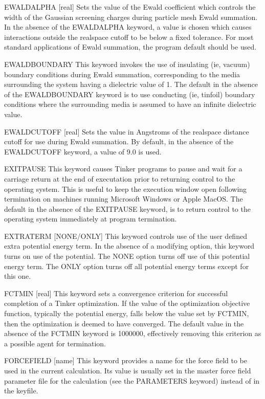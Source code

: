 \documentclass[letterpaper,11pt,english]{sphinxmanual}
\begin{document}
EWALD\sphinxhyphen{}ALPHA {[}real{]}     Sets the value of the Ewald coefficient which controls the width of the Gaussian screening charges during particle mesh Ewald summation. In the absence of the EWALD\sphinxhyphen{}ALPHA keyword, a value is chosen which causes interactions outside the real\sphinxhyphen{}space cutoff to be below a fixed tolerance. For most standard applications of Ewald summation, the program default should be used.

EWALD\sphinxhyphen{}BOUNDARY     This keyword invokes the use of insulating (ie, vacuum) boundary conditions during Ewald summation, corresponding to the media surrounding the system having a dielectric value of 1. The default in the absence of the EWALD\sphinxhyphen{}BOUNDARY keyword is to use conducting (ie, tinfoil) boundary conditions where the surrounding media is assumed to have an infinite dielectric value.

EWALD\sphinxhyphen{}CUTOFF {[}real{]}     Sets the value in Angstroms of the real\sphinxhyphen{}space distance cutoff for use during Ewald summation. By default, in the absence of the EWALD\sphinxhyphen{}CUTOFF keyword, a value of 9.0 is used.

EXIT\sphinxhyphen{}PAUSE     This keyword causes Tinker programs to pause and wait for a carriage return at the end of executation prior to returning control to the operating system. This is useful to keep the execution window open following termination on machines running Microsoft Windows or Apple MacOS. The default in the absence of the EXIT\sphinxhyphen{}PAUSE keyword, is to return control to the operating system immediately at program termination.

EXTRATERM {[}NONE/ONLY{]}     This keyword controls use of the user defined extra potential energy term. In the absence of a modifying option, this keyword turns on use of the potential. The NONE option turns off use of this potential energy term. The ONLY option turns off all potential energy terms except for this one.

FCTMIN {[}real{]}     This keyword sets a convergence criterion for successful completion of a Tinker optimization. If the value of the optimization objective function, typically the potential energy, falls below the value set by FCTMIN, then the optimization is deemed to have converged. The default value in the absence of the FCTMIN keyword is \sphinxhyphen{}1000000, effectively removing this criterion as a possible agent for termination.

FORCEFIELD {[}name{]}     This keyword provides a name for the force field to be used in the current calculation. Its value is usually set in the master force field parameter file for the calculation (see the PARAMETERS keyword) instead of in the keyfile.
\end{document}
